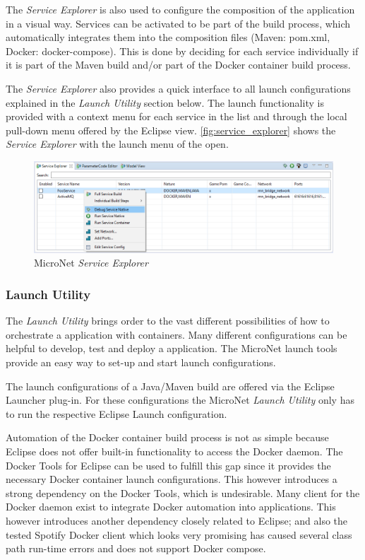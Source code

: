 The \textit{Service Explorer} is also used to configure the composition of the
application in a visual way. Services can be activated to be part of the build
process, which automatically integrates them into the composition files (Maven:
pom.xml, Docker: docker-compose). This is done by deciding for each service
individually if it is part of the Maven build and/or part of the Docker
container build process.

The \textit{Service Explorer} also provides a quick interface to all launch
configurations explained in the \textit{Launch Utility} section below. The launch
functionality is provided with a context menu for each service in the list and
through the local pull-down menu offered by the Eclipse view.
\autoref{fig:service_explorer} shows the \textit{Service Explorer} with the
launch menu of the  open.

\begin{figure}
	\centering
	\includegraphics[width=\textwidth]{images/tools/ServiceExplorer}
	\caption{MicroNet \textit{Service Explorer}}
	\label{fig:service_explorer}
\end{figure}

\subsubsection{Launch Utility}

The \textit{Launch Utility} brings order to the vast different possibilities of
how to orchestrate a \ms{} application with containers. Many different configurations
can be helpful to develop, test and deploy a \ms{} application. The MicroNet
launch tools provide an easy way to set-up and start launch configurations.

The launch configurations of a Java/Maven build are offered via the Eclipse
Launcher plug-in. For these configurations the MicroNet \textit{Launch Utility}
only has to run the respective Eclipse Launch configuration.

Automation of the Docker container build process is not as simple because
Eclipse does not offer built-in functionality to access the Docker daemon.
The Docker Tools for Eclipse can be used to fulfill this gap since it provides
the necessary Docker container launch configurations. This however introduces a
strong dependency on the Docker Tools, which is undesirable. Many client for the
Docker daemon exist to integrate Docker automation into applications. This
however introduces another dependency closely related to Eclipse; and also the
tested Spotify Docker client which looks very promising has caused several class
path run-time errors and does not support Docker compose.

